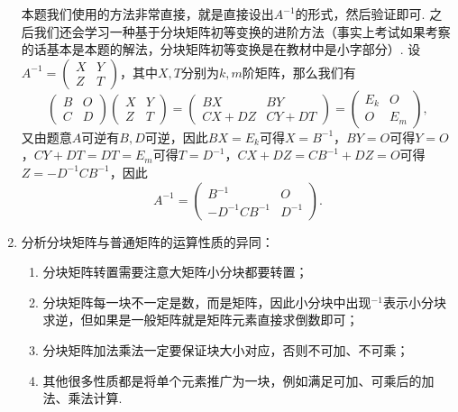 \begin{enumerate}
          \begin{solution}
              本题我们使用的方法非常直接，就是直接设出$A^{-1}$的形式，然后验证即可. 之后我们还会学习一种基于分块矩阵初等变换的进阶方法（事实上考试如果考察的话基本是本题的解法，分块矩阵初等变换是在教材中是小字部分）. 设$A^{-1}=\begin{pmatrix}
                      X & Y \\ Z & T
                  \end{pmatrix}$，其中$X,T$分别为$k,m$阶矩阵，那么我们有
              \[\begin{pmatrix}
                      B & O \\ C & D
                  \end{pmatrix}\begin{pmatrix}
                      X & Y \\ Z & T
                  \end{pmatrix}=\begin{pmatrix}
                      BX & BY \\ CX+DZ & CY+DT
                  \end{pmatrix}=\begin{pmatrix}
                      E_k & O \\ O & E_m
                  \end{pmatrix},\]
              又由题意$A$可逆有$B,D$可逆，因此$BX=E_k$可得$X=B^{-1}$，$BY=O$可得$Y=O$，$CY+DT=DT=E_m$可得$T=D^{-1}$，$CX+DZ=CB^{-1}+DZ=O$可得$Z=-D^{-1}CB^{-1}$，因此
              \[A^{-1}=\begin{pmatrix}
                      B^{-1} & O \\ -D^{-1}CB^{-1} & D^{-1}
                  \end{pmatrix}.\]
          \end{solution}

    \item 分析分块矩阵与普通矩阵的运算性质的异同：
          \begin{enumerate}
              \item 分块矩阵转置需要注意大矩阵小分块都要转置；

              \item 分块矩阵每一块不一定是数，而是矩阵，因此小分块中出现$^{-1}$表示小分块求逆，但如果是一般矩阵就是矩阵元素直接求倒数即可；

              \item 分块矩阵加法乘法一定要保证块大小对应，否则不可加、不可乘；

              \item 其他很多性质都是将单个元素推广为一块，例如满足可加、可乘后的加法、乘法计算.
          \end{enumerate}
\end{enumerate}


